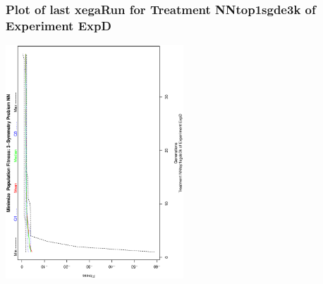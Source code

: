  \begin{frame}
 \frametitle{ Plot of last xegaRun for Treatment NNtop1sgde3k of Experiment ExpD }
 \begin{center}
\includegraphics[width=0.5\textwidth, angle=-90]
{ExpDPlotPopStatsFigure006.eps}
 \end{center}
 \label{report/ExpDPlotPopStatsFigure006.eps}  
 \end{frame}

